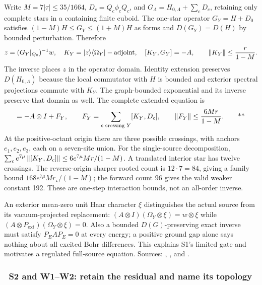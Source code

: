 Write $M=7|\tau|\le35/1664$, $D_c=Q_c\phi_cQ_c$, and
$G_\Lambda=H_{0,\Lambda}+\sum_cD_c$, retaining only complete stars in a containing
finite cuboid.  The one-star operator $G_Y=H+D_0$ satisfies
$(1-M)H\le G_Y\le(1+M)H$ as forms and
$D(G_Y)=D(H)$ by bounded perturbation.  Therefore
\begin{equation}
 z=(G_Y|_{Q_0})^{-1}w,\quad
 K_Y=|z\rangle\langle\Omega_Y|-\mathrm{adjoint},\quad
 [K_Y,G_Y]=-A,\qquad \left\lVert K_Y\right\rVert\le\frac{r}{1-M}.
 \label{recent:interior-inverse}
\end{equation}
The inverse places $z$ in the operator domain.  Identity extension preserves
$D(H_{0,\Lambda})$ because the local commutator with $H$ is bounded and exterior
spectral projections commute with $K_Y$.  The graph-bounded exponential and its
inverse preserve that domain as well.  The complete extended equation is
\begin{equation}
 [K_Y\otimes I,G_\Lambda]=-A\otimes I+F_Y,\qquad
 F_Y=\sum_{c\text{ crossing }Y}[K_Y,D_c],\qquad
 \norm{F_Y}\le\frac{6Mr}{1-M}. \qquad\text{\workstar}
 \label{recent:crossing-defect}
\end{equation}
At the positive-octant origin there are three possible crossings, with anchors
$e_1,e_2,e_3$, each on a seven-site union.  For the single-source decomposition,
$\sum_c e^{7\mu}\left\lVert [K_Y,D_c]\right\rVert\le6e^{7\mu}Mr/(1-M)$.  A translated interior
star has twelve crossings.  The reverse-origin sharper rooted count is
$12\cdot7=84$, giving a family bound $168e^{7\mu}Mr_\star/(1-M)$; the forward
count 96 gives the valid weaker constant 192.  These are one-step interaction
bounds, not an all-order inverse.

An exterior mean-zero unit Haar character $\xi$ distinguishes the actual source
from its vacuum-projected replacement:
$(A\otimes I)(\Omega_Y\otimes\xi)=w\otimes\xi$ while
$(A\otimes P_{\mathrm{ext}})(\Omega_Y\otimes\xi)=0$.  Also a bounded
$D(G)$-preserving exact inverse must satisfy $P_EAP_E=0$ at every energy; a
positive ground gap alone says nothing about all excited Bohr differences.
This explains S1's limited gate and motivates a regulated full-source equation.
Sources: ,
, and
.

\subsubsection{\workstar\ S2 and W1--W2: retain the residual and name its topology}

